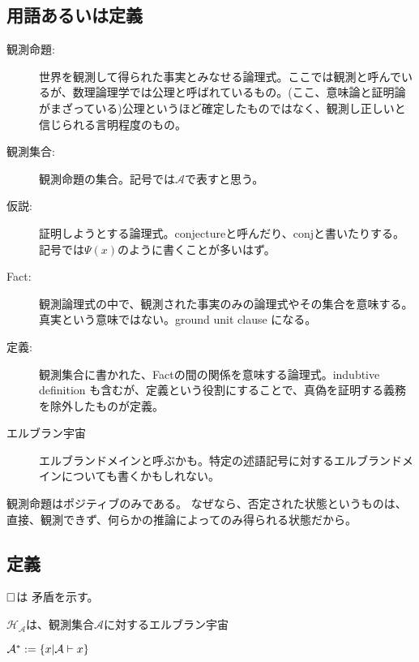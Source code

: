 
\subsection{用語あるいは定義}
\begin{description}
\item[観測命題:] 世界を観測して得られた事実とみなせる論理式。ここでは観測と呼んでいるが、数理論理学では公理と呼ばれているもの。(ここ、意味論と証明論がまざっている)公理というほど確定したものではなく、観測し正しいと信じられる言明程度のもの。
\item[観測集合:] 観測命題の集合。記号では$\mathcal{A}$で表すと思う。
\item[仮説:] 証明しようとする論理式。conjectureと呼んだり、conjと書いたりする。記号では$\Psi(x)$のように書くことが多いはず。
\item[Fact:] 観測論理式の中で、観測された事実のみの論理式やその集合を意味する。真実という意味ではない。ground unit clause になる。
\item[定義:] 観測集合に書かれた、Factの間の関係を意味する論理式。indubtive definition も含むが、定義という役割にすることで、真偽を証明する義務を除外したものが定義。
\item[エルブラン宇宙] エルブランドメインと呼ぶかも。特定の述語記号に対するエルブランドメインについても書くかもしれない。
\end{description}


観測命題はポジティブのみである。
なぜなら、否定された状態というものは、直接、観測できず、何らかの推論によってのみ得られる状態だから。


\subsection{定義}

$\Box$は 矛盾を示す。

$\mathcal{H_{\mathcal{A}}}$は、観測集合$\mathcal{A}$に対するエルブラン宇宙

$\mathcal{A}^{*} := \{x | \mathcal{A} \vdash x\}$





